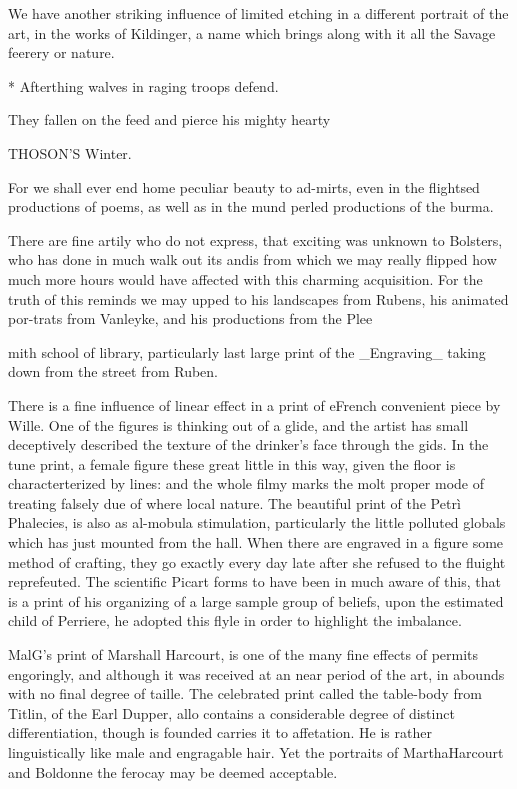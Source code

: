 \documentclass{article}
\begin{document}
We have another striking influence of limited etching in a different portrait of the art, in the works of Kildinger, a name which brings along with it all the Savage feerery or nature.

* Afterthing walves in raging troops defend.

They fallen on the feed and pierce his mighty hearty

THOSON'S Winter.

For we shall ever end home peculiar beauty to ad-mirts, even in the flightsed productions of poems, as well as in the mund perled productions of the burma.

There are fine artily who do not express, that exciting was unknown to Bolsters, who has done in much walk out its andis from which we may really flipped how much more hours would have affected with this charming acquisition. For the truth of this reminds we may upped to his landscapes from Rubens, his animated por-trats from Vanleyke, and his productions from the Plee

mith school of library, particularly last large print of the \_Engraving\_ taking down from the street from Ruben.

There is a fine influence of linear effect in a print of eFrench convenient piece by Wille. One of the figures is thinking out of a glide, and the artist has small deceptively described the texture of the drinker's face through the gids. In the tune print, a female figure these great little in this way, given the floor is characterterized by lines: and the whole filmy marks the molt proper mode of treating falsely due of where local nature. The beautiful print of the Petrì Phalecies, is also as al-mobula stimulation, particularly the little polluted globals which has just mounted from the hall. When there are engraved in a figure some method of crafting, they go exactly every day late after she refused to the fluight reprefeuted. The scientific Picart forms to have been in much aware of this, that is a print of his organizing of a large sample group of beliefs, upon the estimated child of Perriere, he adopted this flyle in order to highlight the imbalance.

MalG's print of Marshall Harcourt, is one of the many fine effects of permits engoringly, and although it was received at an near period of the art, in abounds with no final degree of taille. The celebrated print called the table-body from Titlin, of the Earl Dupper, allo contains a considerable degree of distinct differentiation, though is founded carries it to affetation. He is rather linguistically like male and engragable hair. Yet the portraits of MarthaHarcourt and Boldonne the ferocay may be deemed acceptable.
\end{document}
